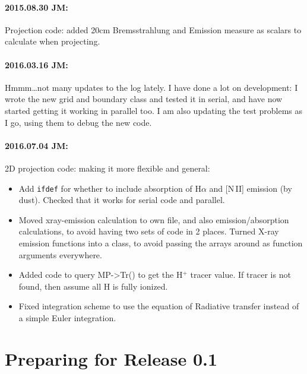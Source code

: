 \documentclass[a4paper,11pt]{article}
\begin{document}
\paragraph{2015.08.30 JM:}
Projection code: added 20cm Bremsstrahlung and Emission measure as scalars to calculate when projecting.

\paragraph{2016.03.16 JM:}
Hmmm\ldots not many updates to the log lately.
I have done a lot on \pion{} development: I wrote the new grid and boundary class and tested it in serial, and have now started getting it working in parallel too.
I am also updating the test problems as I go, using them to debug the new code.

\paragraph{2016.07.04 JM:}
2D projection code:  making it more flexible and general:
\begin{itemize}
\item Add \texttt{ifdef} for whether to include absorption of H$\alpha$ and [N\,II] emission (by dust).  Checked that it works for serial code and parallel.
\item Moved xray-emission calculation to own file, and also emission/absorption calculations, to avoid having two sets of code in 2 places.
Turned X-ray emission functions into a class, to avoid passing the arrays around as function arguments everywhere.
\item Added code to query MP->Tr() to get the H$^+$ tracer value.  If tracer is not found, then assume all H is fully ionized.
\item Fixed integration scheme to use the equation of Radiative transfer instead of a simple Euler integration.
\end{itemize}

\section{Preparing for Release 0.1}
\end{document}
